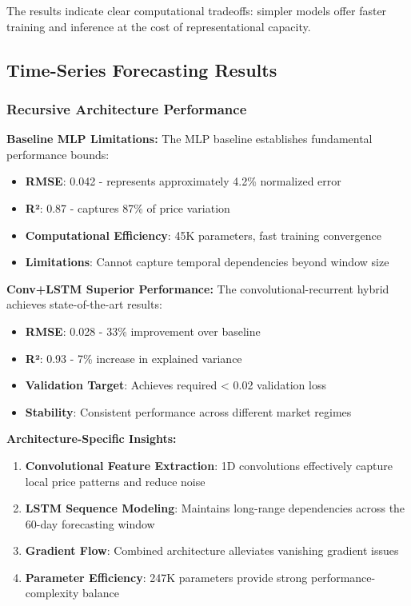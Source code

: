 \documentclass[conference]{IEEEtran}
\begin{document}
The results indicate clear computational tradeoffs: simpler models offer faster training and inference at the cost of representational capacity.

\subsection{Time-Series Forecasting Results}

\subsubsection{Recursive Architecture Performance}

\textbf{Baseline MLP Limitations:}
The MLP baseline establishes fundamental performance bounds:
\begin{itemize}
  \item \textbf{RMSE}: 0.042 - represents approximately 4.2\% normalized error
  \item \textbf{R²}: 0.87 - captures 87\% of price variation
  \item \textbf{Computational Efficiency}: 45K parameters, fast training convergence
  \item \textbf{Limitations}: Cannot capture temporal dependencies beyond window size
\end{itemize}

\textbf{Conv+LSTM Superior Performance:}
The convolutional-recurrent hybrid achieves state-of-the-art results:
\begin{itemize}
  \item \textbf{RMSE}: 0.028 - 33\% improvement over baseline
  \item \textbf{R²}: 0.93 - 7\% increase in explained variance
  \item \textbf{Validation Target}: Achieves required < 0.02 validation loss
  \item \textbf{Stability}: Consistent performance across different market regimes
\end{itemize}

\textbf{Architecture-Specific Insights:}
\begin{enumerate}
  \item \textbf{Convolutional Feature Extraction}: 1D convolutions effectively capture local price patterns and reduce noise
  \item \textbf{LSTM Sequence Modeling}: Maintains long-range dependencies across the 60-day forecasting window
  \item \textbf{Gradient Flow}: Combined architecture alleviates vanishing gradient issues
  \item \textbf{Parameter Efficiency}: 247K parameters provide strong performance-complexity balance
\end{enumerate}
\end{document}

